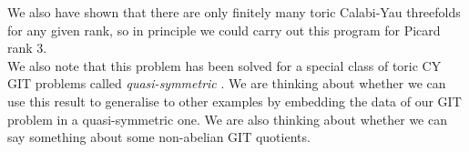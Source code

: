 \documentclass[oneside,reqno]{amsart}
\theoremstyle{definition}
\theoremstyle{definition}
\theoremstyle{definition}
\theoremstyle{definition}
\begin{document}
\newline
We also have shown that there are only finitely many toric Calabi-Yau threefolds for any given rank, so in principle we could carry out this program for Picard rank 3. \\
\newline
We also note that this problem has been solved for a special class of toric CY GIT problems called \textit{quasi-symmetric} \cite{quasi-sym}. We are thinking about whether we can use this result to generalise to other examples by embedding the data of our GIT problem in a quasi-symmetric one. We are also thinking about whether we can say something about some non-abelian GIT quotients. 


\end{document}
